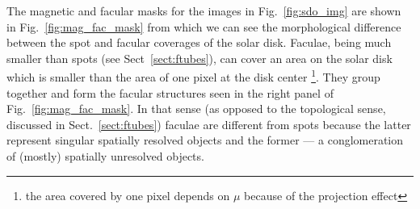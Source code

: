 \documentclass[paper=a4, fontsize=11pt]{article}
\numberwithin{equation}{section}
\numberwithin{figure}{section}
\numberwithin{table}{section}
\begin{document}
The magnetic and facular masks for the images in Fig.~\ref{fig:sdo_img} are shown in Fig.~\ref{fig:mag_fac_mask}
from which we can see the morphological difference between the spot and facular coverages of the solar disk.
Faculae, being much smaller than spots (see Sect~\ref{sect:ftubes}), can cover an area on the 
solar disk which is smaller than the area of one pixel at the disk center
\footnote{the area covered by one pixel depends on $\mu$ because of the projection effect}.
They group together and form the facular structures seen in the right panel of Fig.~\ref{fig:mag_fac_mask}.
In that sense (as opposed to the topological sense, discussed in Sect.~\ref{sect:ftubes})
faculae are different from spots because the latter represent singular spatially resolved objects and the former ---
a conglomeration of (mostly) spatially unresolved objects.
\end{document}
